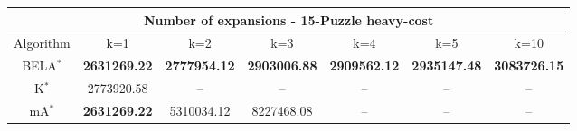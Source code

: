 \begin{tabular}{c|cccccc}\toprule
\multicolumn{7}{c}{Number of expansions - 15-Puzzle heavy-cost}\\ \midrule
Algorithm & k=1 & k=2 & k=3 & k=4 & k=5 & k=10 \\ \midrule
BELA$^*$ & \textbf{2631269.22} & \textbf{2777954.12} & \textbf{2903006.88} & \textbf{2909562.12} & \textbf{2935147.48} & \textbf{3083726.15} \\
K$^*$ & 2773920.58 & -- & -- & -- & -- & -- \\
mA$^*$ & \textbf{2631269.22} & 5310034.12 & 8227468.08 & -- & -- & -- \\ \bottomrule 
\end{tabular}
